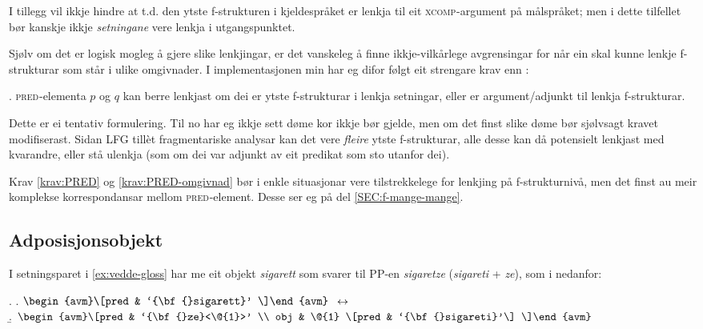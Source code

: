 \documentclass[11pt,a4paper,oneside,draft]{book}
\newcommand{\F}[2]{\textsc{#1}\ensuremath{_{#2}}}
\newcommand{\XCOMP}{\F{xcomp}{}}
\newcommand{\PRED}{\F{pred}{}}
\begin{document}
I tillegg vil ikkje \Last hindre at t.d. den ytste f-strukturen i
kjeldespråket er lenkja til eit \XCOMP{}-argument på målspråket; men i
dette tilfellet bør kanskje ikkje \emph{setningane} vere lenkja i
utgangspunktet.

Sjølv om det er logisk mogleg å gjere slike lenkjingar, er det
vanskeleg å finne ikkje-vilkårlege avgrensingar for når ein skal kunne
lenkje f-strukturar som står i ulike omgivnader. I implementasjonen
min har eg difor følgt eit strengare krav enn \Last[e]:

\ex. \label{krav:PRED-omgivnad} \PRED{}-elementa $p$ og $q$ kan berre
     lenkjast om dei er ytste f-strukturar i lenkja setningar, eller
     er argument/adjunkt til lenkja f-strukturar.

Dette er ei tentativ formulering. Til no har eg ikkje sett døme kor
\Last ikkje bør gjelde, men om det finst slike døme bør sjølvsagt
kravet modifiserast. Sidan LFG tillèt fragmentariske analysar kan det
vere \emph{fleire} ytste f-strukturar, alle desse kan då potensielt
lenkjast med kvarandre, eller stå ulenkja (som om dei var adjunkt av
eit predikat som sto utanfor dei).

Krav \ref{krav:PRED} og \ref{krav:PRED-omgivnad} bør i enkle
situasjonar vere tilstrekkelege for lenkjing på f-strukturnivå, men
det finst au meir komplekse korrespondansar mellom \PRED{}-element. Desse
ser eg på del \ref{SEC:f-mange-mange}.


\subsection{Adposisjonsobjekt}
\label{sec-3.6.4}

\label{SEC:adposisjonsobjekt}

 I setningsparet i \ref{ex:vedde-gloss} har me eit objekt \emph{sigarett}
 som svarer til PP-en \emph{sigaretze} (\emph{sigareti} + \emph{ze}), som i \Next
 nedanfor:

{\avmoptions{}
\ex. \a. $\begin{avm}\[pred & `{\bf{}sigarett}' \]\end{avm}\\$
     $\\\leftrightarrow$\\
     \b.     $\begin{avm}\[pred & `{\bf{}ze}<\@{1}>' \\
                 obj & \@{1} \[pred & `{\bf{}sigareti}'\] \]\end{avm}$

}
\end{document}
